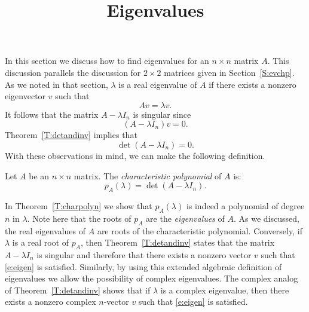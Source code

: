 \documentclass{ximera}
\title{Eigenvalues}
\begin{document}
\begin{abstract}
\end{abstract}
\maketitle

 \label{S:eig} 
 
In this section we discuss how to find eigenvalues for an
$n\times n$ matrix $A$.  This discussion parallels the
discussion for $2\times 2$ matrices given in
Section~\ref{S:evchp}.  As we noted in that section, $\lambda$
is a real eigenvalue of $A$ if there exists a nonzero
eigenvector $v$ such that
\begin{equation}  \label{e:eigen}
Av = \lambda v.
\end{equation}
It follows that the matrix $A-\lambda I_n$ is 
singular since
\[
(A-\lambda I_n)v = 0.
\]
Theorem~\ref{T:detandinv} implies that 
\[
\det(A-\lambda I_n) = 0.
\]
With these observations in mind, we can make the following definition.
\begin{definition}   \label{D:charpoly}
Let $A$ be an $n\times n$ matrix.  The {\em characteristic polynomial\/} 
of $A$ is:
\[
p_A(\lambda) = \det(A-\lambda I_n).
\]  
\end{definition}

In Theorem~\ref{T:charpolyn} we show that $p_A(\lambda)$ is indeed a 
polynomial of degree $n$ in $\lambda$.  Note here that the roots of 
$p_A$ are the {\em eigenvalues\/} of $A$. As we
discussed, the real eigenvalues 
of $A$ are roots of the
characteristic polynomial.   Conversely, if
$\lambda$ is a real root of $p_A$, then
Theorem~\ref{T:detandinv} states that the matrix $A-\lambda I_n$
is singular and therefore that there exists a nonzero vector $v$
such that \eqref{e:eigen} is satisfied.  Similarly, by using this
extended algebraic definition of eigenvalues we allow the
possibility of complex eigenvalues.  
The complex analog of
Theorem~\ref{T:detandinv} shows that if $\lambda$ is a complex
eigenvalue, then there exists a nonzero complex $n$-vector $v$
such that \eqref{e:eigen} is satisfied.
\end{document}
